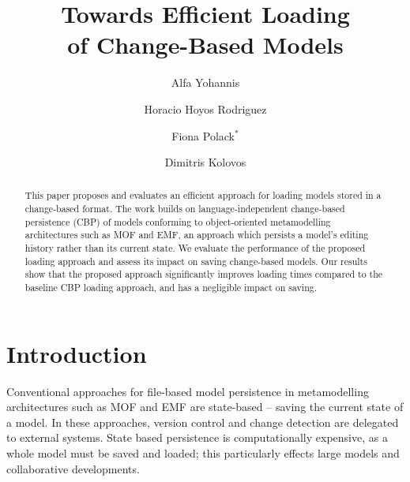 \documentclass{llncs}
\begin{document}
    \renewcommand{\thelstlisting}{\arabic{lstlisting}}
    \renewcommand{\labelitemi}{$\bullet$}
    \newcommand{\dk}[1]{\textbf{[DK: #1]}}
    
    \title{Towards Efficient Loading \\ of Change-Based Models}
    \author{
Alfa Yohannis \and Horacio Hoyos Rodriguez \and Fiona Polack$^*$ \and Dimitris Kolovos
    }
    
    
    \maketitle      %
    \begin{abstract}
This paper proposes and evaluates an efficient approach for loading models stored in a change-based format. The work builds on language-independent change-based persistence (CBP) of models conforming to object-oriented metamodelling architectures such as MOF and EMF, an approach which persists a model's editing history rather than its current state. We evaluate the performance of the proposed loading approach and assess its impact on saving change-based models. Our results show that the proposed approach significantly improves loading times compared to the baseline CBP loading approach, and has a negligible impact on saving.

    \end{abstract}
    
    \section{Introduction}
    \label{sec:introduction}
    Conventional approaches for file-based model persistence in metamodelling architectures such as MOF \cite{omg2018mof} and EMF \cite{steinberg2008emf} are state-based -- saving the current state of a model.  In these approaches,  version control and change detection are delegated to external systems.  State based persistence is computationally expensive, as a whole model must be saved and loaded; this particularly effects large models and collaborative developments.
    
\end{document}
